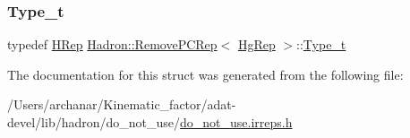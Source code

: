 \subsubsection{\texorpdfstring{Type\_t}{Type\_t}\hspace{0.1cm}{\footnotesize\ttfamily [2/2]}}
{\footnotesize\ttfamily typedef \mbox{\hyperlink{structHadron_1_1HRep}{H\+Rep}} \mbox{\hyperlink{structHadron_1_1RemovePCRep}{Hadron\+::\+Remove\+P\+C\+Rep}}$<$ \mbox{\hyperlink{structHadron_1_1HgRep}{Hg\+Rep}} $>$\+::\mbox{\hyperlink{structHadron_1_1RemovePCRep_3_01HgRep_01_4_a85716e0795bf8043fb7f217c9cc34a0e}{Type\+\_\+t}}}



The documentation for this struct was generated from the following file\+:\begin{DoxyCompactItemize}
\item 
/\+Users/archanar/\+Kinematic\+\_\+factor/adat-\/devel/lib/hadron/do\+\_\+not\+\_\+use/\mbox{\hyperlink{adat-devel_2lib_2hadron_2do__not__use_2do__not__use_8irreps_8h}{do\+\_\+not\+\_\+use.\+irreps.\+h}}\end{DoxyCompactItemize}
